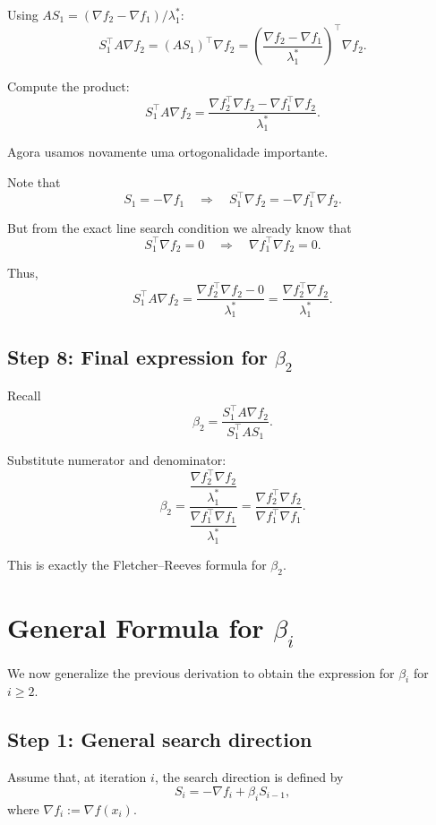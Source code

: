 \documentclass[9pt,a4paper]{extarticle}
\begin{document}
Using $A S_1 = (\nabla f_2 - \nabla f_1)/\lambda_1^*$:
\[
S_1^\top A \nabla f_2
= (A S_1)^\top \nabla f_2
= \left( \frac{\nabla f_2 - \nabla f_1}{\lambda_1^*} \right)^\top \nabla f_2.
\]

Compute the product:
\[
S_1^\top A \nabla f_2
= \frac{\nabla f_2^\top \nabla f_2 - \nabla f_1^\top \nabla f_2}{\lambda_1^*}.
\]

Agora usamos novamente uma ortogonalidade importante.

Note that
\[
S_1 = -\nabla f_1
\quad\Longrightarrow\quad
S_1^\top \nabla f_2 = - \nabla f_1^\top \nabla f_2.
\]

But from the exact line search condition we already know that
\[
S_1^\top \nabla f_2 = 0
\quad\Longrightarrow\quad
\nabla f_1^\top \nabla f_2 = 0.
\]

Thus,
\[
S_1^\top A \nabla f_2
= \frac{\nabla f_2^\top \nabla f_2 - 0}{\lambda_1^*}
= \frac{\nabla f_2^\top \nabla f_2}{\lambda_1^*}.
\]

\subsection*{Step 8: Final expression for \texorpdfstring{$\beta_2$}{beta2}}

Recall
\[
\beta_2 = \frac{S_1^\top A \nabla f_2}{S_1^\top A S_1}.
\]

Substitute numerator and denominator:
\[
\beta_2
= \frac{\dfrac{\nabla f_2^\top \nabla f_2}{\lambda_1^*}}{\dfrac{\nabla f_1^\top \nabla f_1}{\lambda_1^*}}
= \frac{\nabla f_2^\top \nabla f_2}{\nabla f_1^\top \nabla f_1}.
\]

This is exactly the Fletcher--Reeves formula for $\beta_2$.

\section{General Formula for \texorpdfstring{$\beta_i$}{beta\_i}}

We now generalize the previous derivation to obtain the expression for $\beta_i$ for $i \ge 2$.

\subsection*{Step 1: General search direction}

Assume that, at iteration $i$, the search direction is defined by
\[
S_i = -\nabla f_i + \beta_i S_{i-1},
\]
where $\nabla f_i := \nabla f(x_i)$.
\end{document}
